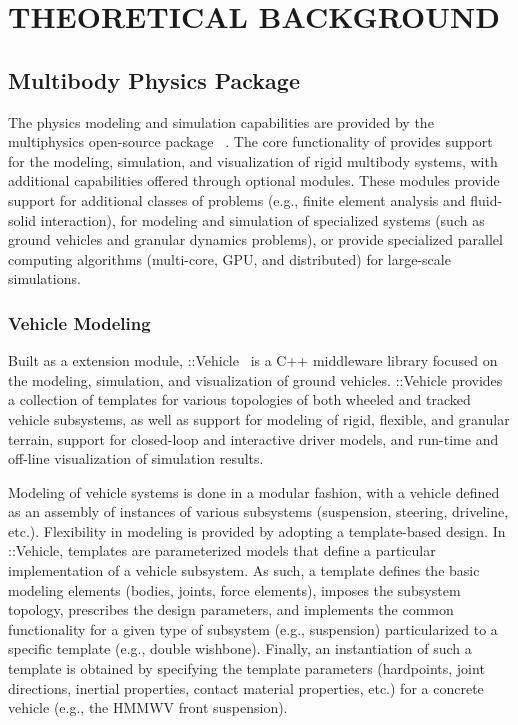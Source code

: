 \documentclass[12pt,onecolumn]{article}
\newcommand{\CHRONO}{{\sffamily{{Chrono}}}}
\newcommand{\ChronoVehicle}{{\sffamily{Chrono}}::Vehicle}
\begin{document}

\section{THEORETICAL BACKGROUND}\label{s:background}

\subsection{{\CHRONO} Multibody Physics Package}\label{ss:Chrono}

The physics modeling and simulation capabilities are provided by the multiphysics open-source package {\CHRONO}~\cite{Chrono2016}. The core functionality of {\CHRONO} provides support for the modeling, simulation, and visualization of rigid multibody systems, with additional capabilities offered through optional modules. These modules provide support for additional classes of problems (e.g., finite element analysis and fluid-solid interaction), for modeling and simulation of specialized systems (such as ground vehicles and granular dynamics problems), or provide specialized parallel computing algorithms (multi-core, GPU, and distributed) for large-scale simulations.


\subsubsection{Vehicle Modeling}\label{sss:Chrono_Vehicle}
	
Built as a {\CHRONO} extension module, {\ChronoVehicle}~\cite{ChronoVehicle_paper} is a C++ middleware library focused on the modeling, simulation, and visualization of ground vehicles.
%
{\ChronoVehicle} provides a collection of templates for various topologies of both wheeled and tracked vehicle subsystems, as well as support for modeling of rigid, flexible, and granular terrain, support for closed-loop and interactive driver models, and run-time and off-line visualization of simulation results.

Modeling of vehicle systems is done in a modular fashion, with a vehicle defined as an assembly of instances of various subsystems (suspension, steering, driveline, etc.).  Flexibility in modeling is provided by adopting a template-based design. In {\ChronoVehicle}, templates are parameterized models that define a particular implementation of a vehicle subsystem. As such, a template defines the basic modeling elements (bodies, joints, force elements), imposes the subsystem topology, prescribes the design parameters, and implements the common functionality for a given type of subsystem (e.g., suspension) particularized to a specific template (e.g., double wishbone). Finally, an instantiation of such a template is obtained by specifying the template parameters (hardpoints, joint directions, inertial properties, contact material properties, etc.) for a concrete vehicle (e.g., the HMMWV front suspension).
\end{document}
